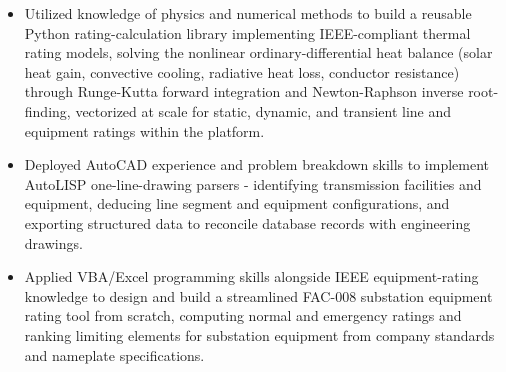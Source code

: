 \documentclass[10pt, letterpaper]{article}
\newenvironment{rlist}{%
  \begin{itemize}[leftmargin=1.4em, itemsep=1pt, topsep=2pt, parsep=0pt]%
}{%
  \end{itemize}%
}
\begin{document}
\begin{rlist}
  \item Utilized knowledge of physics and numerical methods to build a reusable Python rating-calculation library implementing IEEE-compliant thermal rating models, solving the nonlinear ordinary-differential heat balance (solar heat gain, convective cooling, radiative heat loss, conductor resistance) through Runge-Kutta forward integration and Newton-Raphson inverse root-finding, vectorized at scale for static, dynamic, and transient line and equipment ratings within the platform.
  \item Deployed AutoCAD experience and problem breakdown skills to implement AutoLISP one-line-drawing parsers - identifying transmission facilities and equipment, deducing line segment and equipment configurations, and exporting structured data to reconcile database records with engineering drawings.
  \item Applied VBA/Excel programming skills alongside IEEE equipment-rating knowledge to design and build a streamlined FAC-008 substation equipment rating tool from scratch, computing normal and emergency ratings and ranking limiting elements for substation equipment from company standards and nameplate specifications.
\end{rlist}
\end{document}
